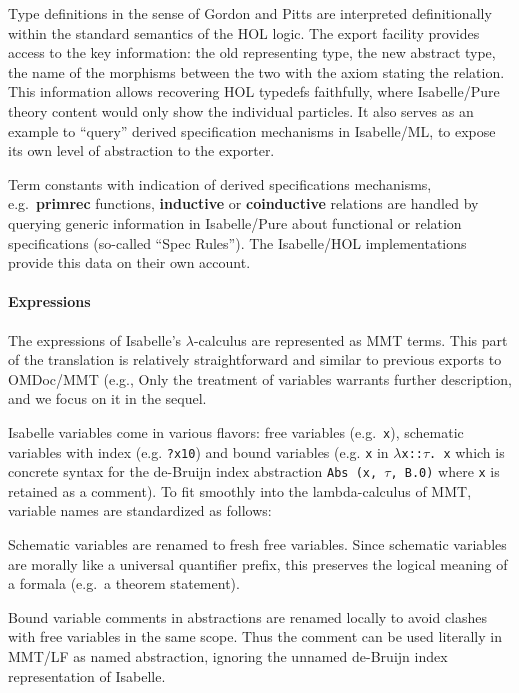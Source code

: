 Type definitions in the sense of Gordon and
  Pitts \cite{pitts93} are interpreted
  definitionally within the standard semantics of the HOL
  logic. The export facility provides access to the key
  information: the old representing type, the new abstract type, the
  name of the morphisms between the two with the axiom stating the
  relation.
  This information allows recovering HOL typedefs faithfully, where
  Isabelle/Pure theory content would only show the individual
  particles. It also serves as an example to ``query'' derived
  specification mechanisms in Isabelle/ML, to expose its own level of
  abstraction to the exporter.
  
Term constants with indication of derived specifications
  mechanisms, e.g.\ \textbf{primrec} functions, \textbf{inductive} or
  \textbf{coinductive} relations are handled by querying generic
  information in Isabelle/Pure about functional or relation
  specifications (so-called ``Spec Rules''). The Isabelle/HOL
  implementations provide this data on their own account.

\paragraph{Expressions}
The expressions of Isabelle's $\lambda$-calculus are represented as MMT terms.
This part of the translation is relatively straightforward and similar to previous exports to OMDoc/MMT (e.g., 
Only the treatment of variables warrants further description, and we focus on it in the sequel.

Isabelle variables come in various flavors: free variables (e.g.\
\verb,x,), schematic variables with index (e.g. \verb,?x10,) and bound
variables (e.g. \verb,x, in $\lambda$\verb,x::,$\tau$\verb,. x, which
is concrete syntax for the de-Bruijn index abstraction
\verb;Abs (x, ;$\tau$\verb;, B.0); where \verb,x, is retained as a
comment). To fit smoothly into the lambda-calculus of MMT, variable
names are standardized as follows:

Schematic variables are renamed to fresh free variables. Since
  schematic variables are morally like a universal quantifier prefix,
  this preserves the logical meaning of a formala (e.g.\ a theorem
  statement).

Bound variable comments in abstractions are renamed locally to
  avoid clashes with free variables in the same scope. Thus the
  comment can be used literally in MMT/LF as named abstraction,
  ignoring the unnamed de-Bruijn index representation of Isabelle.

